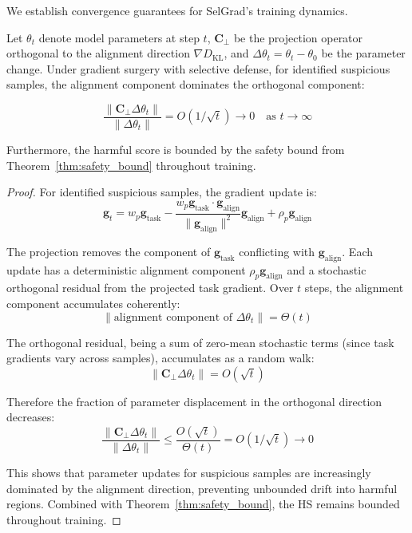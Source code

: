 We establish convergence guarantees for SelGrad's training dynamics.

\begin{theorem}
\label{thm:convergence}
Let $\theta_t$ denote model parameters at step $t$, $\mathbf{C}_\perp$ be the projection operator orthogonal to the alignment direction $\nabla D_{\text{KL}}$, and $\Delta\theta_t = \theta_t - \theta_0$ be the parameter change. Under gradient surgery with selective defense, for identified suspicious samples, the alignment component dominates the orthogonal component:

\begin{equation}
\frac{\|\mathbf{C}_\perp \Delta\theta_t\|}{\|\Delta\theta_t\|} = O(1/\sqrt{t}) \to 0 \quad \text{as } t \to \infty
\end{equation}

Furthermore, the harmful score is bounded by the safety bound from Theorem~\ref{thm:safety_bound} throughout training.
\end{theorem}

\begin{proof}
For identified suspicious samples, the gradient update is:
\begin{equation}
\mathbf{g}_t = w_p \mathbf{g}_{\text{task}} - \frac{w_p \mathbf{g}_{\text{task}} \cdot \mathbf{g}_{\text{align}}}{\|\mathbf{g}_{\text{align}}\|^2}\mathbf{g}_{\text{align}} + \rho_p \mathbf{g}_{\text{align}}
\end{equation}

The projection removes the component of $\mathbf{g}_{\text{task}}$ conflicting with $\mathbf{g}_{\text{align}}$. Each update has a deterministic alignment component $\rho_p \mathbf{g}_{\text{align}}$ and a stochastic orthogonal residual from the projected task gradient. Over $t$ steps, the alignment component accumulates coherently:
\begin{equation}
\|\text{alignment component of } \Delta\theta_t\| = \Theta(t)
\end{equation}

The orthogonal residual, being a sum of zero-mean stochastic terms (since task gradients vary across samples), accumulates as a random walk:
\begin{equation}
\|\mathbf{C}_\perp \Delta\theta_t\| = O(\sqrt{t})
\end{equation}

Therefore the fraction of parameter displacement in the orthogonal direction decreases:
\begin{equation}
\frac{\|\mathbf{C}_\perp \Delta\theta_t\|}{\|\Delta\theta_t\|} \leq \frac{O(\sqrt{t})}{\Theta(t)} = O(1/\sqrt{t}) \to 0
\end{equation}

This shows that parameter updates for suspicious samples are increasingly dominated by the alignment direction, preventing unbounded drift into harmful regions. Combined with Theorem~\ref{thm:safety_bound}, the HS remains bounded throughout training.
\end{proof}

